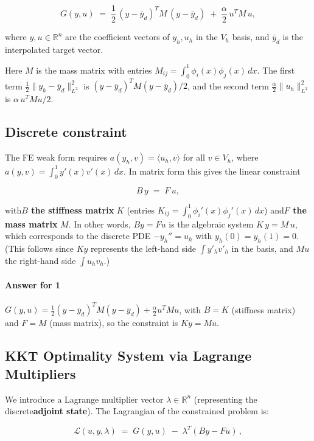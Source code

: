 \documentclass[a4paper,10pt]{article}
\begin{document}
\[
	G(y,u) \;=\; \frac{1}{2}\,(y - \bar y_d)^T M\, (y - \bar y_d)\;+\;\frac{\alpha}{2}\,u^T M\,u,
\]

where \(y, u \in \mathbb{R}^n\) are the coefficient vectors of \(y_h, u_h\) in the \(V_h\) basis, and \(\bar y_d\) is the interpolated target vector.

Here \(M\) is the mass matrix with entries \(M_{ij}=\int_0^1 \phi_i(x)\phi_j(x)\,dx\). The first term \(\frac{1}{2}\|y_h - \bar y_d\|_{L^2}^2\) is \((y-\bar y_d)^T M (y-\bar y_d)/2\), and the second term \(\frac{\alpha}{2}\|u_h\|_{L^2}^2\) is \(\alpha\,u^T M u/2\).

\subsection{Discrete constraint}

The FE weak form requires \(a(y_h,v) = \langle u_h,v\rangle\) for all \(v\in V_h\), where \(a(y,v)=\int_0^1 y'(x)v'(x)\,dx\). In matrix form this gives the linear constraint

\[
	B\,y \;=\; F\,u,
\]

with\textbf{\(B\) the stiffness matrix} \(K\) (entries \(K_{ij}=\int_0^1 \phi_i'(x)\phi_j'(x)\,dx\)) and\textbf{\(F\) the mass matrix} \(M\).  In other words, \(By=Fu\) is the algebraic system \(K\,y = M\,u\), which corresponds to the discrete PDE \(-y_h''=u_h\) with \(y_h(0)=y_h(1)=0\). (This follows since \(K y\) represents the left-hand side \(\int y'_h v'_h\) in the basis, and \(M u\) the right-hand side \(\int u_h v_h\).)

\paragraph{Answer for 1}
\(G(y,u)=\frac12 (y-\bar y_d)^T M (y-\bar y_d) + \frac{\alpha}{2} u^T M u\), with \(B=K\) (stiffness matrix) and \(F=M\) (mass matrix), so the constraint is \(K y = M u\).

\subsection{KKT Optimality System via Lagrange Multipliers}

We introduce a Lagrange multiplier vector \(\lambda\in\mathbb{R}^n\) (representing the discrete\textbf{adjoint state}). The Lagrangian of the constrained problem is:

\[
	\mathcal{L}(u,y,\lambda) \;=\; G(y,u)\;-\;\lambda^T(B y - F u)\,,
\]
\end{document}
